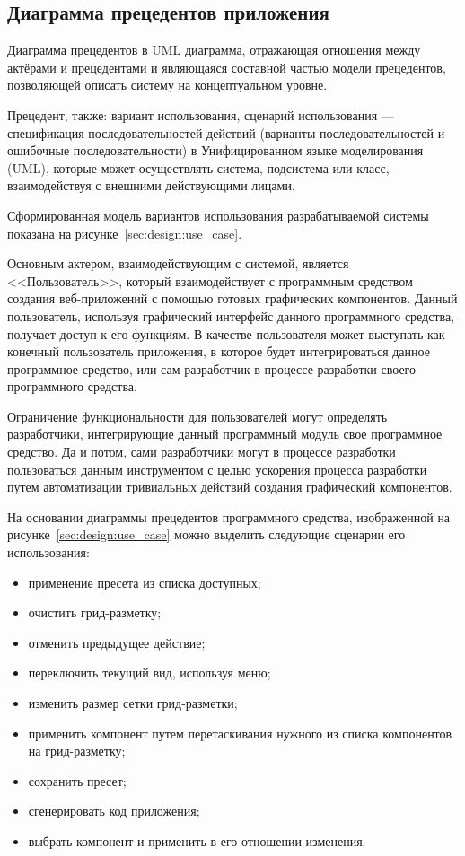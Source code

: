 \subsection{Диаграмма прецедентов приложения}
\label{sec:design:use_case_diagram}

Диаграмма прецедентов в UML диаграмма, отражающая отношения между актёрами и прецедентами и являющаяся составной частью модели прецедентов, позволяющей описать систему на концептуальном уровне.

Прецедент, также: вариант использования, сценарий использования — спецификация последовательностей действий (варианты последовательностей и ошибочные последовательности) в Унифицированном языке моделирования (UML), которые может осуществлять система, подсистема или класс, взаимодействуя с внешними действующими лицами.

Сформированная модель вариантов использования разрабатываемой системы показана на рисунке~\ref{sec:design:use_case}.

Основным актером, взаимодействующим с системой, является <<Пользователь>>, который взаимодействует с программным средством создания веб-приложений с помощью 
готовых графических компонентов. Данный пользователь, используя графический интерфейс данного программного средства, получает доступ к его функциям. В качестве пользователя может выступать как конечный пользователь приложения, в которое будет интегрироваться данное программное средство, или сам разработчик в процессе разработки своего программного средства.

Ограничение функциональности для пользователей могут определять разработчики, интегрирующие данный программный модуль свое программное средство. Да и потом, сами разработчики могут в процессе разработки пользоваться данным инструментом с целью ускорения процесса разработки путем автоматизации тривиальных действий создания графический компонентов.\pagebreak

На основании диаграммы прецедентов программного средства, изображенной на рисунке~\ref{sec:design:use_case} можно выделить следующие сценарии его использования:
\begin{itemize}
    \item применение пресета из списка доступных;
    \item очистить грид-разметку;
    \item отменить предыдущее действие;
    \item переключить текущий вид, используя меню;
    \item изменить размер сетки грид-разметки;
    \item применить компонент путем перетаскивания нужного из списка компонентов на грид-разметку;
    \item сохранить пресет;
    \item сгенерировать код приложения;
    \item выбрать компонент и применить в его отношении изменения.
\end{itemize}

